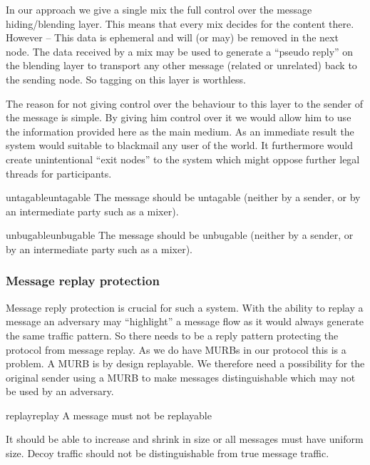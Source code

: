 In our approach we give a single mix the full control over the message hiding/blending layer. This means that every mix decides for the content there. However -- This data is ephemeral and will (or may) be removed in the next node. The data received by a mix may be used to generate a ``pseudo reply'' on the blending layer to transport any other message (related or unrelated) back to the sending node. So tagging on this layer is worthless.

The reason for not giving control over the behaviour to this layer to the sender of the message is simple. By giving him control over it we would allow him to use the information provided here as the main medium. As an immediate result the system would suitable to blackmail any user of the world. It furthermore would create unintentional ``exit nodes'' to the system which might oppose further legal threads for participants.

\begin{requirement}{untagable}{untagable}
	The message should be untagable (neither by a sender, or by an intermediate party such as a mixer).
\end{requirement}

\begin{requirement}{unbugable}{unbugable}
	The message should be unbugable (neither by a sender, or by an intermediate party such as a mixer).
\end{requirement}

\subsubsection{Message replay protection}
Message reply protection is crucial for such a system. With the ability to replay a message an adversary may ``highlight'' a message flow as it would always generate the same traffic pattern. So there needs to be a reply pattern protecting the protocol from message replay. As we do have MURBs in our protocol this is a problem. A MURB is by design replayable. We therefore need a possibility for the original sender using a MURB to make messages distinguishable which may not be used by an adversary.

\begin{requirement}{replay}{replay}
	A message must not be replayable
\end{requirement}

It should be able to increase and shrink in size or all messages must have uniform size. Decoy traffic should not be distinguishable from true message traffic. 

